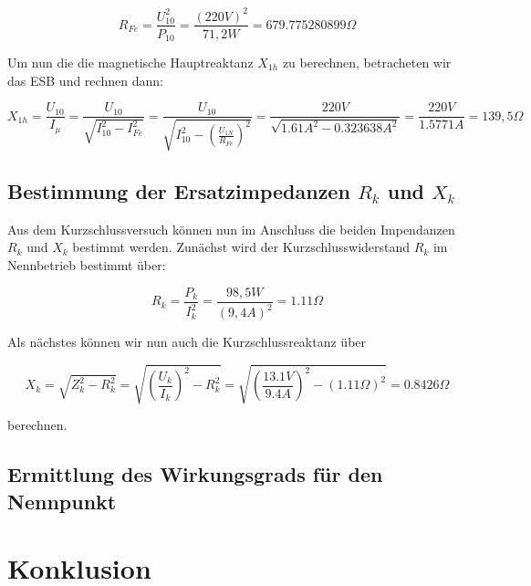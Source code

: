 \documentclass{article}
\begin{document}
\begin{equation*}
  R_{Fe} = \frac{U_{10}^{2}}{P_{10}} = \frac{(220V)^{2}}{71,2W} = 679.775280899\Omega
\end{equation*}

Um nun die die magnetische Hauptreaktanz $X_{1h}$ zu berechnen, betracheten wir das ESB und rechnen dann:

\begin{equation*}
  X_{1h} = \frac{U_{10}}{I_{\mu}} = \frac{U_{10}}{\sqrt{I_{10}^{2}-I_{Fe}^{2}}} = \frac{U_{10}}{\sqrt{I_{10}^{2}-\left(\frac{U_{1N}}{R_{Fe}}\right)^{2}}} = \frac{220V}{\sqrt{1.61A^{2}-0.323638A^{2}}} = \frac{220V}{1.5771A} = 139,5\Omega
\end{equation*}

\subsection{Bestimmung der Ersatzimpedanzen $R_{k}$ und $X_{k}$}
\label{sec:best-der-ersatz-1}

Aus dem Kurzschlussversuch können nun im Anschluss die beiden Impendanzen $R_{k}$ und $X_{k}$ bestimmt werden. Zunächst wird der Kurzschlusswiderstand $R_{k}$ im Nennbetrieb bestimmt über:

\begin{equation*}
  R_{k} = \frac{P_{k}}{I_{k}^{2}} = \frac{98,5W}{(9,4A)^{2}} = 1.11\Omega
\end{equation*}

Als nächstes können wir nun auch die Kurzschlussreaktanz über

\begin{equation*}
  X_{k} = \sqrt{Z_{k}^{2}-R_{k}^{2}} = \sqrt{\left(\frac{U_{k}}{I_{k}}\right)^{2}-R_{k}^{2}} = \sqrt{\left(\frac{13.1V}{9.4A}\right)^{2} - (1.11\Omega)^{2}} = 0.8426\Omega
\end{equation*}

berechnen.
\subsection{Ermittlung des Wirkungsgrads für den Nennpunkt}
\label{sec:ermittl-des-wirk}



\section{Konklusion}
\label{sec:konklusion}
\end{document}
